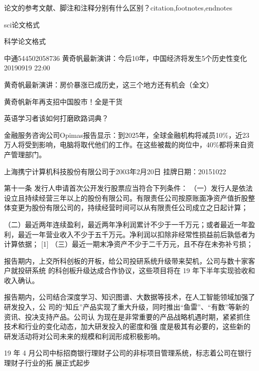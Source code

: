\documentclass[letterpaper,12pt,english]{sphinxmanual}
\begin{document}
论文的参考文献、脚注和注释分别有什么区别？citation,footnotes,endnotes

sci论文格式

科学论文格式

中通544502058736
黄奇帆最新演讲：今后10年，中国经济将发生5个历史性变化2019\sphinxhyphen{}09\sphinxhyphen{}19 22:00

黄奇帆最新演讲：房价暴涨已成历史，这三个地方还有机会（全文）

黄奇帆新年再支招中国股市！全是干货

英语学习者该如何打磨欧路词典？

金融服务咨询公司Opimas报告显示：到2025年，全球金融机构将减员10\%，近23万人将受到影响，电脑将取代他们的工作。在这些被裁的岗位中，40\%都将来自资产管理部门。

上海携宁计算机科技股份有限公司于2003年2月20日
挂牌日期：2015\sphinxhyphen{}10\sphinxhyphen{}22

第十一条 发行人申请首次公开发行股票应当符合下列条件：
（一）发行人是依法设立且持续经营三年以上的股份有限公司。有限责任公司按原账面净资产值折股整体变更为股份有限公司的，持续经营时间可以从有限责任公司成立之日起计算；

（二）最近两年连续盈利，最近两年净利润累计不少于一千万元；或者最近一年盈利，最近一年营业收入不少于五千万元。净利润以扣除非经常性损益前后孰低者为计算依据； {[}1{]}
（三）最近一期末净资产不少于二千万元，且不存在未弥补亏损；

报告期内，上交所科创板的开板，给公司投研系统升级带来契机，公司与数十家客户就投研系统 的科创板升级达成合作协议，这些项目将在 19 年下半年实现验收和收入确认。

报告期内，公司结合深度学习、知识图谱、大数据等技术，在人工智能领域加强了研发投入，公 司的“知丘”产品实现了重大升级，同时推出“鱼雷”、“有数”等新的资讯、投决支持产品。公司认 为现在是非常重要的产品战略机遇时期，紧紧抓住技术和行业的变化动态，加大研发投入的密度和强
度是极其有必要的，这些新的研发活动将对公司未来的规模和利润形成积极影响。

19 年 4 月公司中标招商银行理财子公司的非标项目管理系统，标志着公司在银行理财子行业的拓
展正式起步
\end{document}
